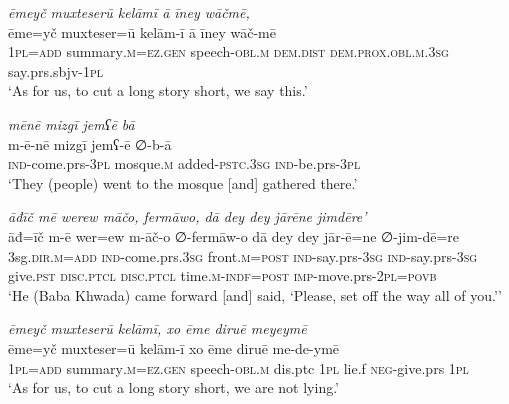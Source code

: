 \ea \label{BP.63}
\textit{ēmeyč muxteserū kelāmī ā īney wāčmē,} \\ 
\gll ēme=yč muxteser=ū kelām-ī ā īney wāč-mē \\ 
 \textsc{1pl}\textsc{=add} summary\textsc{.m}\textsc{=ez.gen} speech\textsc{-obl}\textsc{.m} \textsc{dem.dist} \textsc{dem.prox}\textsc{.obl}\textsc{.m}\textsc{.3sg} say.prs.sbjv\textsc{-\textsc{1pl}} \\ 
\glt `As for us, to cut a long story short, we say this.'
\z 
 
\ea \label{BP.75}
\textit{mēnē mizgī jemʕē bā} \\ 
\gll m-ē-nē mizgī jemʕ-ē ∅-b-ā \\ 
 \textsc{ind-}come.prs\textsc{-3pl} mosque\textsc{.m} added\textsc{-pstc}\textsc{.3sg} \textsc{ind-}be.prs\textsc{-3pl} \\ 
\glt `They (people) went to the mosque [and] gathered there.'
\z 
 
\ea \label{BP.86}
\textit{āđīč mē werew māčo, fermāwo, dā dey dey jārēne jimdēre’} \\ 
\gll āđ=īč m-ē wer=ew m-āč-o ∅-fermāw-o dā dey dey jār-ē=ne ∅-jim-dē=re \\ 
 3sg\textsc{.dir}\textsc{.m}\textsc{=add} \textsc{ind-}come.prs\textsc{.3sg} front\textsc{.m}\textsc{=\textsc{post}} \textsc{ind-}say.prs\textsc{-3sg} \textsc{ind-}say.prs\textsc{-3sg} give\textsc{.pst} \textsc{disc.ptcl} \textsc{disc.ptcl} time\textsc{.m}\textsc{-indf}\textsc{=\textsc{post}} \textsc{imp-}move.prs-\textsc{2pl}\textsc{=\textsc{povb}} \\ 
\glt `He (Baba Khwada) came forward [and] said, ‘Please, set off the way all of you.’'
\z 
 
\ea \label{BP.95}
\textit{ēmeyč muxteserū kelāmī, xo ēme diruē meyeymē} \\ 
\gll ēme=yč muxteser=ū kelām-ī xo ēme diruē me-de-ymē \\ 
 \textsc{1pl}\textsc{=add} summary\textsc{.m}\textsc{=ez.gen} speech\textsc{-obl}\textsc{.m} dis.ptc \textsc{1pl} lie.f \textsc{neg-}give.prs \textsc{1pl} \\ 
\glt `As for us, to cut a long story short, we are not lying.'
\z 
 
